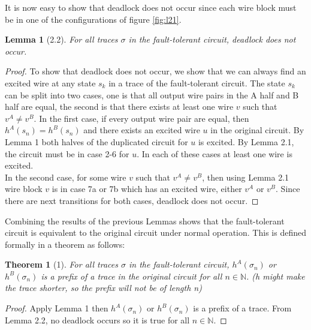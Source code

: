 \documentclass[12pt]{report}
\newtheorem*{theorem}{Theorem}
\newtheorem*{lemma}{Lemma}
\begin{document}
It is now easy to show that deadlock does not occur since each wire block must be in one of the configurations of figure \ref{fig:l21}.
\begin{lemma}[2.2]
For all traces $\sigma$ in the fault-tolerant circuit, deadlock does not occur.
\end{lemma}
\begin{proof}
To show that deadlock does not occur, we show that we can always find an excited wire at any state $s_k$ in a trace of the fault-tolerant circuit.  The state $s_k$ can be split into two cases, one is that all output wire pairs in the A half and B half are equal, the second is that there exists at least one wire $v$ such that $v^A\neq v^B$.  In the first case, if every output wire pair are equal, then $h^A(s_n)=h^B(s_n)$ and there exists an excited wire $u$ in the original circuit.  By Lemma 1 both halves of the duplicated circuit for $u$ is excited.  By Lemma 2.1, the circuit must be in case 2-6 for $u$.  In each of these cases at least one wire is excited.  \\
In the second case, for some wire $v$ such that $v^A\neq v^B$, then using Lemma 2.1 wire block $v$ is in case 7a or 7b which has an excited wire, either $v^A$ or $v^B$.  Since there are next transitions for both cases, deadlock does not occur.
\end{proof}

Combining the results of the previous Lemmas shows that the fault-tolerant circuit is equivalent to the original circuit under normal operation.  This is defined formally in a theorem as follows:
\begin{theorem}[1]
For all traces $\sigma$ in the fault-tolerant circuit, $h^{A}(\sigma_n)$ or $h^{B}(\sigma_n)$ is a prefix of a trace in the original circuit for all $n \in \mathbb{N}$.  (h might make the trace shorter, so the prefix will not be of length n) %
\end{theorem}
\begin{proof}
Apply Lemma 1 then $h^{A}(\sigma_n)$ or $h^{B}(\sigma_n)$ is a prefix of a trace.  From Lemma 2.2, no deadlock occurs so it is true for all $n\in \mathbb{N}$.
\end{proof}
\end{document}
